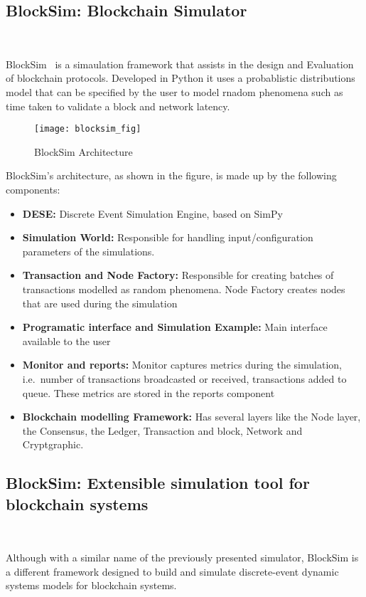 \subsection{BlockSim: Blockchain Simulator}~\label{subsec:blocksim1}

BlockSim~\cite{blocksim1} is a simaulation framework that assists in the design and Evaluation
of blockchain protocols. Developed in Python it uses a probablistic distributions model that
can be specified by the user to model rnadom phenomena such as time taken to validate a block and
network latency.

\begin{figure}[h]
	\centering
	\texttt{[image: blocksim\_fig]}
	\caption{BlockSim Architecture}
	\label{fig:blocksim_fig}
\end{figure}

BlockSim's architecture, as shown in the figure, is made up by the following components:

\begin{itemize}
  \item \textbf{DESE:} Discrete Event Simulation Engine, based on SimPy
  \item \textbf{Simulation World:} Responsible for handling input/configuration parameters
  of the simulations.
  \item \textbf{Transaction and Node Factory:} Responsible for creating batches of 
  transactions modelled as random phenomena. Node Factory creates nodes that are used 
  during the simulation
  \item \textbf{Programatic interface and Simulation Example:} Main interface available to 
  the user
  \item \textbf{Monitor and reports:} Monitor captures metrics during the simulation, 
  i.e.\ number of transactions broadcasted or received, transactions added to queue. 
  These metrics are stored in the reports component
  \item \textbf{Blockchain modelling Framework:} Has several layers like the Node layer,
  the Consensus, the Ledger, Transaction and block, Network and Cryptgraphic.
\end{itemize}

\subsection{BlockSim: Extensible simulation tool for blockchain systems}~\label{subsec:blocksim2}

Although with a similar name of the previously presented simulator, BlockSim is a different 
framework designed to build and simulate discrete-event dynamic systems models for blockchain systems.

